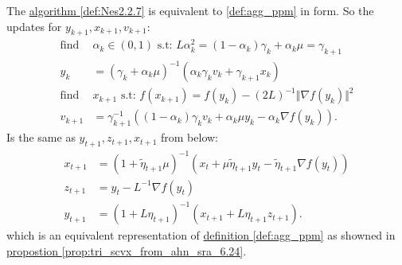 \documentclass[12pt]{article}
\begin{document}
            \begin{proposition}
            \label{prop:Nes2.2.7_via_ahn_sra_6.24}
                The \hyperref[def:Nes2.2.7]{algorithm \ref*{def:Nes2.2.7}} is equivalent to \hyperref[def:agg_ppm]{\ref*{def:agg_ppm}} in form. 
                So the updates for $y_{k + 1}, x_{k + 1}, v_{k + 1}$: 
                \begin{align*}
                    \text{find } &
                    \alpha_k \in (0, 1) 
                    \text{ s.t: } L\alpha_k^2 
                    = (1 - \alpha_k)\gamma_k + \alpha_k \mu = \gamma_{k + 1} 
                    \\
                    y_k &= 
                    \left(
                        \gamma_k + \alpha_k \mu
                    \right)^{-1} \left(
                        \alpha_k \gamma_k v_k + \gamma_{k + 1}x_k
                    \right)
                    \\
                    \text{find } & x_{k + 1} \text{ s.t: }
                    f(x_{k + 1})
                    = f(y_k) - (2L)^{-1}\Vert \nabla f(y_k)\Vert^2
                    \\
                    v_{k+1} &= 
                    \gamma_{k + 1}^{-1} 
                    \left(
                        (1 - \alpha_k) \gamma_k v_k + 
                        \alpha_k \mu y_k 
                        - \alpha_k \nabla f(y_k)
                    \right). 
                \end{align*}
                Is the same as $y_{t + 1}, z_{t + 1}, x_{t + 1}$ from below: 
                \begin{align*}
                    x_{t + 1} 
                    & = 
                    (1 + \tilde \eta_{t + 1}\mu)^{-1}
                    (x_t + \mu\tilde \eta_{t + 1}y_t - \tilde \eta_{t + 1}\nabla f(y_t))
                    \\
                    z_{t + 1} &= y_t - L^{-1} \nabla f(y_t)
                    \\
                    y_{t + 1} &= 
                    (1 + L\eta_{t + 1})^{-1}
                    (x_{t + 1} + L \eta_{t + 1} z_{t + 1}).
                \end{align*}
                which is an equivalent representation of \hyperref[def:agg_ppm]{definition \ref*{def:agg_ppm}} as showned in \hyperref[prop:tri_scvx_from_ahn_sra_6.24]{propostion \ref*{prop:tri_scvx_from_ahn_sra_6.24}}. 
            \end{proposition}
\end{document}
